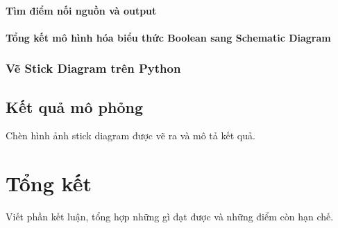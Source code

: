 \documentclass[a4paper,12pt]{article}
\begin{document}
\paragraph{Tìm điểm nối nguồn và output}
\paragraph{Tổng kết mô hình hóa biểu thức Boolean sang Schematic Diagram}
\subsubsection{Vẽ Stick Diagram trên Python}
\subsection{Kết quả mô phỏng}
Chèn hình ảnh stick diagram được vẽ ra và mô tả kết quả.
\section{Tổng kết}
Viết phần kết luận, tổng hợp những gì đạt được và những điểm còn hạn chế.
\end{document}
